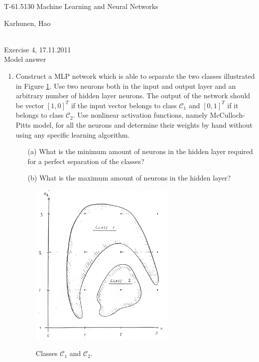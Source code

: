 \documentclass[10pt]{article}
\begin{document}
\pagestyle{empty}
\begin{Large}
\begin{bf} 
T-61.5130 Machine Learning and Neural Networks\\ 
\end{bf}
\end{Large}
Karhunen, Hao\\  
\\
\begin{large}
\begin{bf}
Exercise 4,  17.11.2011\\Model answer
\end{bf}
\end{large}
\begin{enumerate}

\item Construct a MLP network which is able to separate the two
  classes illustrated in Figure \ref{61}. Use two neurons both in the input
  and output layer and an arbitrary number of hidden layer
  neurons. The output of the network should be vector $\left[ 1,
  0\right]^T$ if the input vector belongs to class $\mathcal{C}_1$ and  $\left[ 0,
  1\right]^T$ if it belongs to class $\mathcal{C}_2$. Use nonlinear activation
  functions, namely McCulloch-Pitts model, for all the neurons and
  determine their weights by hand without using any specific learning
  algorithm.
\begin{itemize}
\item[(a)] What is the minimum amount of neurons in the hidden layer
  required for a perfect separation of the classes?
\item[(b)] What is the maximum amount of neurons in the hidden layer?
\end{itemize}

\begin{figure}[hbp]
\centering
\includegraphics[width=7cm]{mlp_classification.ps}
\label{61}
\caption{Classes $\mathcal{C}_1$ and $\mathcal{C}_2$.}
\end{figure}


\end{enumerate}
\end{document}
